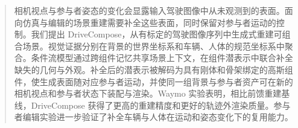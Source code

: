 \begin{abstract}
相机视点与参与者姿态的变化会显露输入驾驶图像中从未观测到的表面。面向仿真与编辑的场景重建需要补全这些表面，同时保留对参与者运动的控制。我们提出 DriveCompose，从有标定的驾驶图像序列中生成式重建可组合场景。视觉证据分别在背景的世界坐标系和车辆、人体的规范坐标系中聚合。条件流模型通过跨组件记忆共享场景上下文，在组件潜表示中联合补全缺失的几何与外观。补全后的潜表示被解码为具有刚体和骨架绑定的高斯组件，使生成表面随对应参与者运动，并使同一组背景与参与者资产可在新的相机视点和参与者状态下装配与渲染。Waymo 实验表明，相比前馈重建基线，DriveCompose 获得了更高的重建精度和更好的轨迹外渲染质量。参与者编辑实验进一步验证了补全车辆与人体在运动和姿态变化下的复用能力。
\end{abstract}
